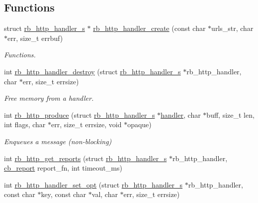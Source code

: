 \subsection*{Functions}
\begin{DoxyCompactItemize}
\item 
struct \hyperlink{structrb__http__handler__s}{rb\-\_\-http\-\_\-handler\-\_\-s} $\ast$ \hyperlink{librb-http_8h_aa84a3dadccb44fa421655ad1b09c3157}{rb\-\_\-http\-\_\-handler\-\_\-create} (const char $\ast$urls\-\_\-str, char $\ast$err, size\-\_\-t errbuf)
\begin{DoxyCompactList}\small\item\em Functions. \end{DoxyCompactList}\item 
int \hyperlink{librb-http_8h_aea4aa423ff2034b027817632c746fd39}{rb\-\_\-http\-\_\-handler\-\_\-destroy} (struct \hyperlink{structrb__http__handler__s}{rb\-\_\-http\-\_\-handler\-\_\-s} $\ast$rb\-\_\-http\-\_\-handler, char $\ast$err, size\-\_\-t errsize)
\begin{DoxyCompactList}\small\item\em Free memory from a handler. \end{DoxyCompactList}\item 
int \hyperlink{librb-http_8h_a0d0d31d9c2dc9ed04d6722e5653b4682}{rb\-\_\-http\-\_\-produce} (struct \hyperlink{structrb__http__handler__s}{rb\-\_\-http\-\_\-handler\-\_\-s} $\ast$\hyperlink{rb__http__handler__example_8c_a0165697b451a136ac74647662a5a39e1}{handler}, char $\ast$buff, size\-\_\-t len, int flags, char $\ast$err, size\-\_\-t errsize, void $\ast$opaque)
\begin{DoxyCompactList}\small\item\em Enqueues a message (non-\/blocking) \end{DoxyCompactList}\item 
int \hyperlink{librb-http_8h_a890e981b619b1bdd5cc37fa16bb06f06}{rb\-\_\-http\-\_\-get\-\_\-reports} (struct \hyperlink{structrb__http__handler__s}{rb\-\_\-http\-\_\-handler\-\_\-s} $\ast$rb\-\_\-http\-\_\-handler, \hyperlink{librb-http_8h_abcf27caf85ec3ac2b11d1b89aed63966}{cb\-\_\-report} report\-\_\-fn, int timeout\-\_\-ms)
\item 
int \hyperlink{librb-http_8h_ab306abb2b4a66b092205de2677d342aa}{rb\-\_\-http\-\_\-handler\-\_\-set\-\_\-opt} (struct \hyperlink{structrb__http__handler__s}{rb\-\_\-http\-\_\-handler\-\_\-s} $\ast$rb\-\_\-http\-\_\-handler, const char $\ast$key, const char $\ast$val, char $\ast$err, size\-\_\-t errsize)
\end{DoxyCompactItemize}


